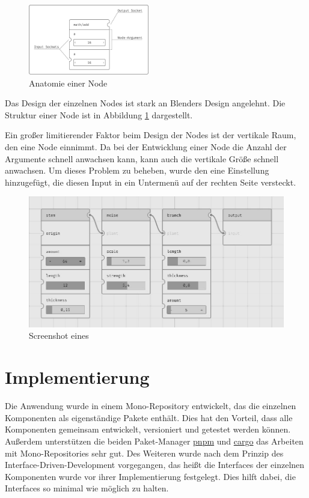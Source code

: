 \documentclass[ngerman]{article}
\begin{document}
\begingroup
\setlength\intextsep{4pt}
\begin{minipage}{\linewidth}
\begin{figure}
    \includegraphics[width=0.47\textwidth]{graphics/NODE_ANATOMY.pdf}
    \caption{Anatomie einer Node}
    \label{sec:NODE_ANATOMY}
\end{figure}

Das Design der einzelnen Nodes ist stark an Blenders Design angelehnt. Die Struktur einer Node ist in Abbildung \ref{sec:NODE_ANATOMY} dargestellt. 

Ein großer limitierender Faktor beim Design der Nodes ist der vertikale Raum, den eine Node einnimmt. Da bei der Entwicklung einer Node die Anzahl der Argumente schnell anwachsen kann, kann auch die vertikale Größe schnell anwachsen. 
Um dieses Problem zu beheben, wurde den  eine Einstellung hinzugefügt, die diesen Input in ein Untermenü auf der rechten Seite versteckt. 
\end{minipage}
\br
\endgroup

\begin{figure}[htpb]
  \centering
  \includegraphics[width=1\textwidth]{graphics/node_graph.jpg}
  \caption{Screenshot eines }
  \label{fig:node_graph_screenshot}
\end{figure}


\section{Implementierung}
Die Anwendung wurde in einem Mono-Repository entwickelt, das die einzelnen Komponenten als eigenständige Pakete enthält. Dies hat den Vorteil, dass alle Komponenten gemeinsam entwickelt, versioniert und getestet werden können. 
\br
Außerdem unterstützen die beiden Paket-Manager \href{https://pnpm.io/}{pnpm} und \href{https://crates.io/}{cargo} das Arbeiten mit 
Mono-Repositories sehr gut. 
\br
Des Weiteren wurde nach dem Prinzip des Interface-Driven-Development vorgegangen, das heißt die Interfaces der einzelnen Komponenten wurde vor ihrer Implementierung festgelegt. Dies hilft dabei, die Interfaces so minimal wie möglich zu halten.
\end{document}
